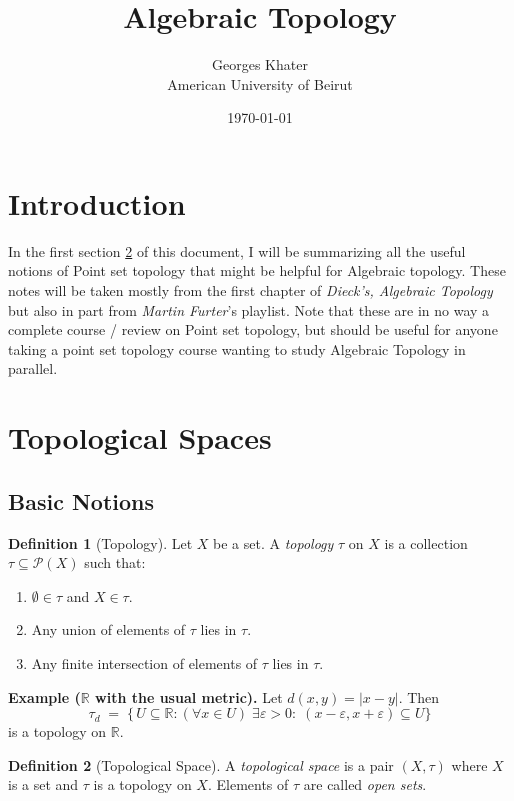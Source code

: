 \documentclass[11pt,a4paper]{article}
\title{\LARGE\bfseries Algebraic Topology}
\author{Georges Khater \\ \small American University of Beirut}
\date{\today}
\theoremstyle{definition}
\newtheorem{definition}{Definition}[section]
\theoremstyle{plain}
\theoremstyle{remark}
\newcommand{\R}{\mathbb{R}}
\begin{document}
\maketitle
\tableofcontents
\bigskip

\section{Introduction} 
In the first section \ref{sec:Topological-spaces} of this document, I will be summarizing all the useful notions of Point set topology that might be helpful for Algebraic topology. 
These notes will be taken mostly from the first chapter of \emph{Dieck's, Algebraic Topology} but also in part from  \emph{Martin Furter}'s playlist. Note that these are in no way a complete 
course / review on Point set topology, but should be useful for anyone taking a point set topology course wanting to study Algebraic Topology in parallel.  

\section{Topological Spaces} \label{sec:Topological-spaces}

\subsection{Basic Notions} 
\begin{definition}[Topology]
Let \(X\) be a set.  A {\it topology} \(\tau\) on \(X\) is a collection \(\tau\subseteq\mathcal P(X)\) such that:
\begin{enumerate}
  \item \(\emptyset\in\tau\) and \(X\in\tau\).
  \item Any union of elements of \(\tau\) lies in \(\tau\).
  \item Any finite intersection of elements of \(\tau\) lies in \(\tau\).
\end{enumerate}
\end{definition}

\noindent\textbf{Example (\(\R\) with the usual metric).}
Let \(d(x,y)=|x-y|\).  Then
\[
  \tau_d \;=\;\{\,U\subseteq\R : (\forall x\in U)\;\exists\varepsilon>0:\;(x-\varepsilon,x+\varepsilon)\subseteq U\}
\]
is a topology on \(\R\).

\begin{definition}[Topological Space]
A {\it topological space} is a pair \((X,\tau)\) where \(X\) is a set and \(\tau\) is a topology on \(X\).  Elements of \(\tau\) are called {\it open sets}.
\end{definition}
\end{document}
